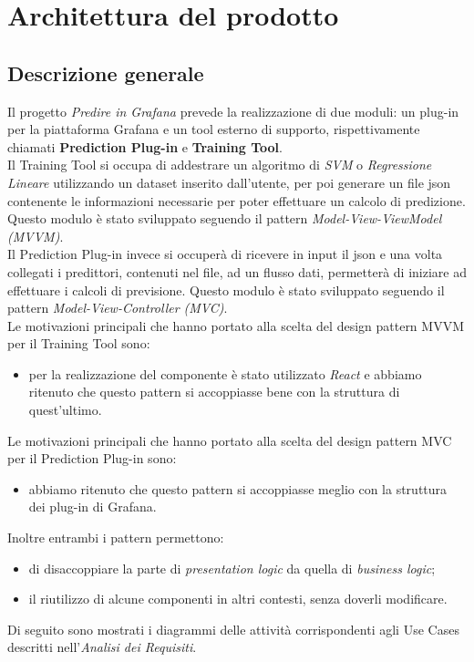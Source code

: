 \section{Architettura del prodotto}

\subsection{Descrizione generale}
Il progetto \textit{Predire in Grafana} prevede la realizzazione di due moduli: un plug-in per la piattaforma Grafana e un tool esterno di supporto, rispettivamente chiamati \textbf{Prediction Plug-in} e \textbf{Training Tool}. \\
Il Training Tool si occupa di addestrare un algoritmo di \textit{SVM} o \textit{Regressione Lineare} utilizzando un dataset inserito dall'utente, per poi generare un file json contenente le informazioni necessarie per poter effettuare un calcolo di predizione. Questo modulo è stato sviluppato seguendo il pattern \textit{Model-View-ViewModel (MVVM)}.\\
Il Prediction Plug-in invece si occuperà di ricevere in input il json e una volta collegati i predittori, contenuti nel file, ad un flusso dati, permetterà di iniziare ad effettuare i calcoli di previsione. Questo modulo è stato sviluppato seguendo il pattern \textit{Model-View-Controller (MVC)}.\\
Le motivazioni principali che hanno portato alla scelta del design pattern MVVM per il Training Tool sono:
\begin{itemize}
	\item per la realizzazione del componente è stato utilizzato \textit{React} e abbiamo ritenuto che questo pattern si accoppiasse bene con la struttura di quest'ultimo.
\end{itemize}
Le motivazioni principali che hanno portato alla scelta del design pattern MVC per il Prediction Plug-in sono:
\begin{itemize}
	\item abbiamo ritenuto che questo pattern si accoppiasse meglio con la struttura dei plug-in di Grafana.
\end{itemize}
Inoltre entrambi i pattern permettono:
\begin{itemize}
	\item di disaccoppiare la parte di \textit{presentation logic} da quella di \textit{business logic};
	\item il riutilizzo di alcune componenti in altri contesti, senza doverli modificare.
\end{itemize}
Di seguito sono mostrati i diagrammi delle attività corrispondenti agli Use Cases descritti nell'\textit{Analisi dei Requisiti}.



